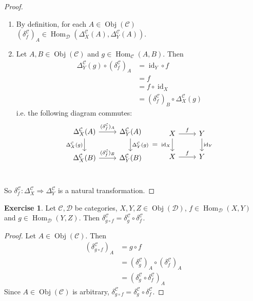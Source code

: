 \documentclass{book}
\theoremstyle{definition}
\newtheorem{ex}[definition]{Exercise}
\newcommand{\del}{\delta}
\newcommand{\Del}{\Delta}
\newcommand{\MC}{\mathcal{C}}
\newcommand{\MD}{\mathcal{D}}
\newcommand{\lex}[1]{\label{ex:#1}}
\DeclareMathOperator{\id}{id}
\DeclareMathOperator{\Obj}{Obj}
\DeclareMathOperator{\Hom}{Hom}
\DeclareMathOperator*{\0}{\mbf{0}}
\DeclareMathOperator*{\1}{\mbf{1}}
\begin{document}
	\begin{proof} \
		\begin{enumerate}
			\item By definition, for each $A \in \Obj(\MC)$ $(\del^{\MC}_f)_A \in \Hom_{\MD}(\Del^{\MC}_X(A), \Del^{\MC}_Y(A))$.
			\item Let $A, B \in \Obj(\MC)$ and $g \in \Hom_{\MC}(A, B)$. Then 
			\begin{align*}
				\Del^{\MC}_Y(g) \circ (\del^{\MC}_f)_A 
				& = \id_Y \circ f \\
				& = f \\
				& = f \circ \id_X \\
				& = (\del^{\MC}_f)_B \circ \Del^{\MC}_X(g)  
			\end{align*}
			i.e. the following diagram commutes:
			\[ 
			\begin{tikzcd}[baseline= 7]
				\Del^{\MC}_X(A)  \arrow[r, "(\del^{\MC}_f)_A"]  \arrow[d, "\Del^{\MC}_X(g)"']  & \Del^{\MC}_Y(A)   \arrow[d, "\Del^{\MC}_Y(g)"]\\
				\Del^{\MC}_X(B) \arrow[r, "(\del^{\MC}_f)_B"] &  \Del^{\MC}_Y(B) \\
			\end{tikzcd}
			=
			\begin{tikzcd}[baseline= 7]
				X  \arrow[r, "f"]  \arrow[d, "\id_X"']  & Y   \arrow[d, "\id_Y"]\\
				X \arrow[r, "f"] &  Y \\
			\end{tikzcd}
			\]
		\end{enumerate}
		So $\del^{\MC}_f: \Del^{\MC}_X \Rightarrow \Del^{\MC}_Y$ is a natural transformation.
	\end{proof}
	 
	\begin{ex} \lex{14010}
		Let $\MC, \MD$ be categories, $X, Y, Z \in \Obj(\MD)$, $f \in \Hom_{\MD}(X,Y)$ and $g \in \Hom_{\MD}(Y,Z)$. Then $\del^{\MC}_{g \circ f} = \del^{\MC}_g \circ \del^{\MC}_f$.
	\end{ex}

	\begin{proof}
		Let $A \in \Obj(\MC)$. Then 
		\begin{align*}
			(\del^{\MC}_{g \circ f})_A
			& = g \circ f \\
			& = (\del^{\MC}_g)_A \circ (\del^{\MC}_f)_A \\
			& = (\del^{\MC}_g \circ \del^{\MC}_f)_A
		\end{align*}
		Since $A \in \Obj(\MC)$ is arbitrary, $\del^{\MC}_{g \circ f} = \del^{\MC}_g \circ \del^{\MC}_f$.
	\end{proof}
\end{document}

